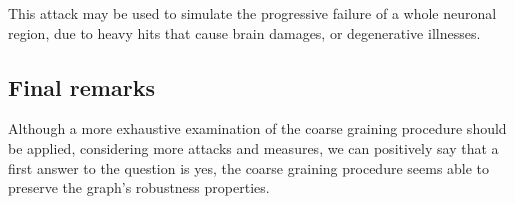 This attack may be used to simulate the progressive failure of a whole neuronal region, due to heavy hits that cause brain damages, or degenerative illnesses.

\subsection{ Final remarks} 
Although a more exhaustive examination of the coarse graining procedure should be applied, considering more attacks and measures, we can positively say that a first answer to the question is yes, the coarse graining procedure seems able to preserve the graph's robustness properties.